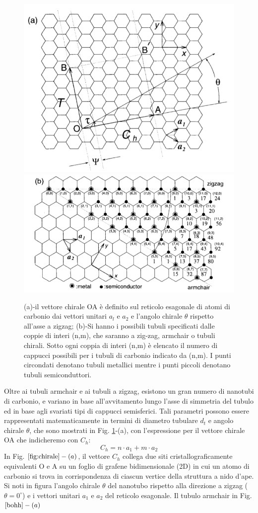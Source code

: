 \documentclass[a4paper,titlepage]{book}
\begin{document}
\begin{figure}[h!]
	\centering
	\includegraphics[width=.49\textwidth]{chirl.png}\hfil
	\includegraphics[width=.49\textwidth]{chirl1.png}
	
	\caption{ 
		(a)-il vettore chirale OA è definito sul reticolo esagonale di atomi di carbonio dai vettori unitari $a_l$ e $a_2$ e l'angolo chirale $\theta$ rispetto all'asse a zigzag; (b)-Si hanno i possibili tubuli specificati dalle coppie di interi (n,m), che saranno a zig-zag, armchair o tubuli chirali. Sotto ogni coppia di interi (n,m) è elencato il numero di cappucci possibili per i tubuli di carbonio indicato da (n,m). 
		I punti circondati denotano tubuli metallici mentre i punti piccoli denotano tubuli semiconduttori. }\label{fig:chirale}
\end{figure}
Oltre ai tubuli armchair e ai tubuli a zigzag, esistono un gran numero di nanotubi di carbonio, e variano in base all'avvitamento lungo l'asse di simmetria del tubulo ed in base agli svariati tipi di cappucci semisferici. Tali parametri possono essere rappresentati matematicamente in termini di diametro tubulare $d_t$ e angolo chirale $\theta$, che sono mostrati in Fig. \ref{fig:chirale}-(a), con l'espressione per il vettore chirale OA che indicheremo con $C_h$:
\begin{equation} \label{ehe}
C_h=n\cdot a_1 + m \cdot a_2
\end{equation}
In Fig. $\ref{fig:chirale}-(a)$, il vettore $C_h$ collega due siti cristallograficamente equivalenti O e A su un foglio di grafene bidimensionale (2D) in cui un atomo di carbonio si trova in corrispondenza di ciascun vertice della struttura a nido d'ape. Si noti in figura l'angolo chirale $\theta$ del nanotubo rispetto alla direzione a zigzag ($\theta = 0^\circ$) e i vettori unitari $a_1$ e $a_2$ del reticolo esagonale. Il tubulo armchair in Fig.$\ref{bohh}-(a)$
\end{document}
